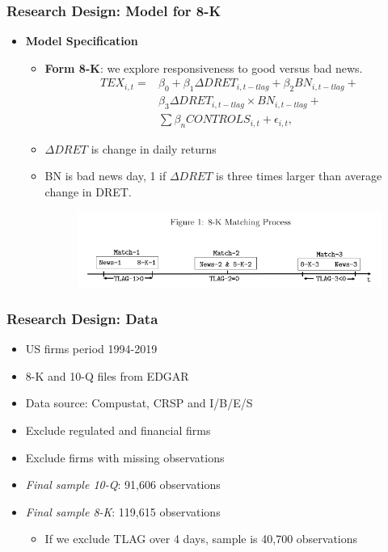 \documentclass{beamer}
\begin{document}
\begin{frame}
\frametitle{Research Design: Model for 8-K}
\begin{itemize}
	
	\item \textbf{Model Specification}
	\begin{itemize}
	
		\item \textbf{Form 8-K}: we explore responsiveness to good versus bad news.
		\begin{equation}
		\begin{aligned}
		\label{eq2}
		TEX_{i,t}=
		&\beta_0+\beta_1\Delta DRET_{i,t-tlag}+\beta_2BN_{i,t-tlag}+\\
		&\beta_3\Delta DRET_{i,t-tlag}\times BN_{i,t-tlag}+\\
		&\sum\beta_nCONTROLS_{i,t}+\epsilon_{i,t},
		\end{aligned}
		\end{equation}
		
		\pause
				\item $\Delta DRET$ is change in daily returns
				\item BN is bad news day, 1 if $\Delta DRET$ is three times larger than average change in DRET.
		
		\begin{figure}[h]
			\centering
			\includegraphics[width=1\linewidth]{fig1}
			\label{fig1}
		\end{figure}
	\end{itemize}
	
\end{itemize}
\end{frame}
\begin{frame}
\frametitle{Research Design: Data}

\begin{itemize}
	\item US firms period 1994-2019
	\item 8-K and 10-Q files from EDGAR
	\item Data source: Compustat, CRSP and I/B/E/S
	\item Exclude regulated and financial firms
	\item Exclude firms with missing observations

\medskip	\pause
	\item \textit{Final sample 10-Q}: 91,606	observations


\medskip	\pause
	\item \textit{Final sample 8-K}: 119,615	observations	
	\begin{itemize}
	\item If we exclude TLAG over 4 days, sample is 40,700 observations
	\end{itemize}
	
\end{itemize}
\end{frame}
\end{document}
